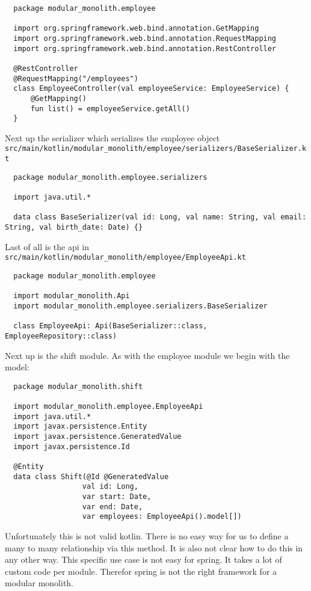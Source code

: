 \begin{verbatim}
  package modular_monolith.employee

  import org.springframework.web.bind.annotation.GetMapping
  import org.springframework.web.bind.annotation.RequestMapping
  import org.springframework.web.bind.annotation.RestController

  @RestController
  @RequestMapping("/employees")
  class EmployeeController(val employeeService: EmployeeService) {
      @GetMapping()
      fun list() = employeeService.getAll()
  }
\end{verbatim}

Next up the serializer which serializes the employee object
\texttt{src/main/kotlin/modular\_monolith/employee/serializers/BaseSerializer.kt}
\begin{verbatim}
  package modular_monolith.employee.serializers

  import java.util.*

  data class BaseSerializer(val id: Long, val name: String, val email: String, val birth_date: Date) {}
\end{verbatim}

Last of all is the api in \texttt{src/main/kotlin/modular\_monolith/employee/EmployeeApi.kt}
\begin{verbatim}
  package modular_monolith.employee

  import modular_monolith.Api
  import modular_monolith.employee.serializers.BaseSerializer

  class EmployeeApi: Api(BaseSerializer::class, EmployeeRepository::class)
\end{verbatim}

Next up is the shift module. As with the employee module we begin with the model:
\begin{verbatim}
  package modular_monolith.shift

  import modular_monolith.employee.EmployeeApi
  import java.util.*
  import javax.persistence.Entity
  import javax.persistence.GeneratedValue
  import javax.persistence.Id

  @Entity
  data class Shift(@Id @GeneratedValue
                  val id: Long,
                  var start: Date,
                  var end: Date,
                  var employees: EmployeeApi().model[])
\end{verbatim}

Unfortunately this is not valid kotlin. There is no easy way for us to define a many to many relationship via this method. It is also not clear how to do this in any other way. This specific use case is not easy for spring. It takes a lot of custom code per module. Therefor spring is not the right framework for a modular monolith.
